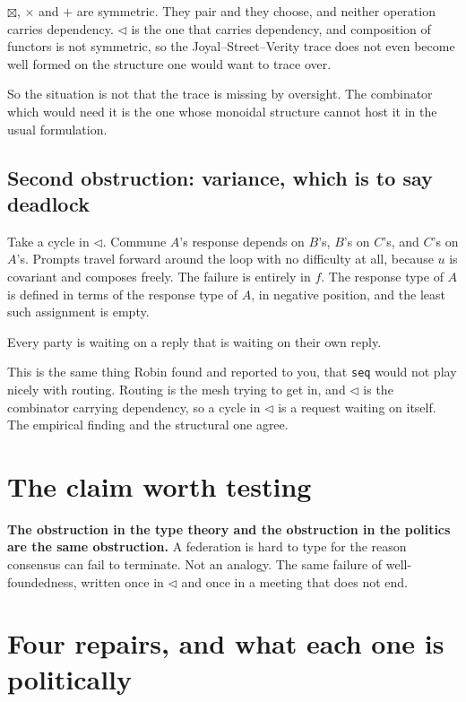 \documentclass[11pt,a4paper]{article}
\begin{document}
$\boxtimes$, $\times$ and $+$ are symmetric. They pair and they choose, and
neither operation carries dependency. $\triangleleft$ is the one that carries
dependency, and composition of functors is not symmetric, so the
Joyal--Street--Verity trace does not even become well formed on the structure one
would want to trace over.

So the situation is not that the trace is missing by oversight. The combinator
which would need it is the one whose monoidal structure cannot host it in the
usual formulation.

\subsection*{Second obstruction: variance, which is to say deadlock}

Take a cycle in $\triangleleft$. Commune $A$'s response depends on $B$'s,
$B$'s on $C$'s, and $C$'s on $A$'s. Prompts travel forward around the loop with
no difficulty at all, because $u$ is covariant and composes freely. The failure
is entirely in $f$. The response type of $A$ is defined in terms of the response
type of $A$, in negative position, and the least such assignment is empty.

Every party is waiting on a reply that is waiting on their own reply.

\begin{sectionbox}
This is the same thing Robin found and reported to you, that \texttt{seq} would
not play nicely with routing. Routing is the mesh trying to get in, and
$\triangleleft$ is the combinator carrying dependency, so a cycle in
$\triangleleft$ is a request waiting on itself. The empirical finding and the
structural one agree.
\end{sectionbox}

\section{The claim worth testing}

\begin{sectionbox}
\textbf{The obstruction in the type theory and the obstruction in the politics are
the same obstruction.} A federation is hard to type for the reason consensus can
fail to terminate. Not an analogy. The same failure of well-foundedness, written
once in $\triangleleft$ and once in a meeting that does not end.
\end{sectionbox}

\section{Four repairs, and what each one is politically}
\end{document}
